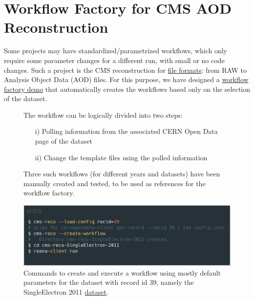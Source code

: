 \section{Workflow Factory for CMS AOD Reconstruction}
Some projects may have standardized/parametrized workflows, which only require some parameter changes for a different run, with small or no code changes. Such a project is the CMS reconstruction for \href{https://twiki.cern.ch/twiki/bin/view/CMSPublic/WorkBookDataFormats}{file formats}: from RAW to Analysis Object Data (AOD) files. For this purpose, we have designed a \href{https://github.com/reanahub/reana-demo-cms-reco}{workflow factory demo} that automatically creates the workflows based only on the selection of the dataset. 

\begin{figure}[H]
    \centering
    \begin{minipage}[H]{0.49\textwidth}
The workflow can be logically divided into two steps:
\begin{itemize}
    \item[i)] Polling information from the associated CERN Open Data page of the dataset
    \item[ii)] Change the template files using the polled information
\end{itemize}
\vspace{1em}
Three such workflows (for different years and datasets) have been manually created and tested, to be used as references for the workflow factory.

     \end{minipage}
 \hfill
    \begin{minipage}[H]{0.49\textwidth}
        \centering
        \includegraphics[width=1.0\textwidth]{figures/workflow_factory.png}
        \caption{Commands to create and execute a workflow using mostly default parameters for the dataset with record id 39, namely the SingleElectron 2011 \href{http://opendata.cern.ch/record/39}{dataset}.}
        \label{fig:workflow_factory}
     \end{minipage}
\end{figure}

